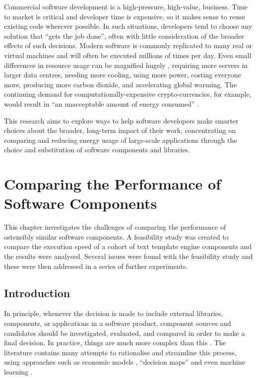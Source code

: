 Commercial software development is a high-pressure, high-value, business. Time to market is critical and developer time is expensive, so it makes sense to reuse existing code wherever possible. In such situations, developers tend to choose any solution that \enquote{gets the job done}, often with little consideration of the broader effects of such decisions. Modern software is commonly replicated to many real or virtual machines and will often be executed millions of times per day. Even small differences in resource usage can be magnified hugely \citep{Vercauteren2007} \citep{Andreolini2006}, requiring more servers in larger data centres, needing more cooling, using more power, costing everyone more, producing more carbon dioxide, and accelerating global warming. The continuing demand for computationally-expensive crypto-currencies, for example, would result in \enquote{an unacceptable amount of energy consumed} \citep{Giungato2017}. 

This research aims to explore ways to help software developers make smarter choices about the broader, long-term impact of their work, concentrating on comparing and reducing energy usage of large-scale applications through the choice and substitution of software components and libraries.

\chapter{Comparing the Performance of Software Components}
\label{chapter:performance}

This chapter investigates the challenges of comparing the performance of ostensibly similar software components. A feasibility study was created to compare the execution speed of a cohort of text \gls{template engine} components and the results were analysed. Several issues were found with the feasibility study and these were then addressed in a series of further experiments.

\section{Introduction}
\label{fs1:intro}

In principle, whenever the decision is made to include external libraries, components, or applications in a software product, component sources and candidates should be investigated, evaluated, and compared in order to make a final decision. In practice, things are much more complex than this \citep{Badampudi2016}. The literature contains many attempts to rationalise and streamline this process, using approaches such as economic models \citep{Milkman2009}, \enquote{decision maps} \citep{Lago2019} and even machine learning \citep{Maxville2004}.

